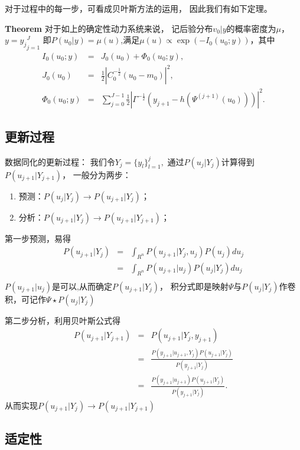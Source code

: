 \documentclass[a4paper,12pt,oneside,CJK]{cctbook}
\theoremstyle{definition}
\numberwithin{equation}{section}
\begin{document}
对于过程中的每一步，可看成贝叶斯方法的运用，
因此我们有如下定理。

\textbf{Theorem} 对于如上的确定性动力系统来说，
记后验分布$v_0|y$的概率密度为$\mu$，$y={y_j}_{j=1}^J$
即$P(u_0|y)=\mu(u)$,满足$\mu(u)\propto \exp(-I_0(u_0;y))$，其中
\begin{eqnarray*}
   I_0(u_0;y)&=&J_0(u_0)+\Phi_0(u_0;y),\\
   J_0(u_0)&=&\frac{1}{2}|C_0^{-\frac{1}{2}}(u_0-m_0)|^2,\\
   \Phi_0(u_0;y)&=&\sum_{j=0}^{J-1}\frac{1}{2}|\Gamma^{-\frac{1}{2}}(y_{j+1}-h(\Psi^{(j+1)}(u_0)))|^2.
\end{eqnarray*}

\subsection{更新过程}

数据同化的更新过程：
我们令$Y_j=\{y_l\}_{l=1}^j,$
通过$P(u_{j}|Y_j)$计算得到$P(u_{j+1}|Y_{j+1})$，
一般分为两步：
\begin{enumerate}
  \item 预测：$P(u_{j}|Y_j)\rightarrow P(u_{j+1}|Y_j)$；
  \item 分析：$P(u_{j+1}|Y_j)\rightarrow P(u_{j+1}|Y_{j+1})$；
\end{enumerate}

第一步预测，易得
\begin{eqnarray*}
   P(u_{j+1}|Y_j)&=&\int_{R^{n}}P(u_{j+1}|Y_j,u_j)P(u_j)du_j\\
                 &=&\int_{R^{n}}P(u_{j+1}|u_j)P(u_j|Y_j)du_j\\
\end{eqnarray*}
$P(u_{j+1}|u_j)$是可以,从而确定$P(u_{j+1}|Y_j)$，
积分式即是映射$\Psi$与$P(u_{j}|Y_j)$作卷积，可记作$\Psi \star P(u_j|Y_j)$

第二步分析，利用贝叶斯公式得
\begin{eqnarray*}
     P(u_{j+1}|Y_{j+1})&=&P(u_{j+1}|Y_j,y_{j+1})\\
    &=&\frac{P(y_{j+1}|u_{j+1},Y_j)P(u_{j+1}|Y_j)}{P(y_{j+1}|Y_j)}\\
    &=&\frac{P(y_{j+1}|u_{j+1})P(u_{j+1}|Y_j)}{P(y_{j+1}|Y_j)}.
\end{eqnarray*}
从而实现$P(u_{j+1}|Y_j)\rightarrow P(u_{j+1}|Y_{j+1})$

\subsection{适定性}
\end{document}
